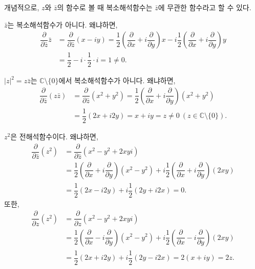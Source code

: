 개념적으로, $z$와 $\bar z$의 함수로 볼 때
복소해석함수는  $\bar z$에 무관한 함수라고 할 수 있다.

\begin{saltexample}{}{} \label{example-2-14}
$\bar z$는 복소해석함수가 아니다. 왜냐하면,
\begin{align*}
\dfrac{\partial}{\partial \bar z}\bar z 
&= \dfrac{\partial}{\partial \bar z} (x-iy)
= \dfrac 12 \left( \dfrac\partial {\partial x} + i \dfrac\partial {\partial y} \right) x
- i \dfrac 12 \left( \dfrac\partial {\partial x} + i \dfrac\partial {\partial y} \right) y \\
&= \dfrac 12 - i\cdot \dfrac12 \cdot i = 1 \ne 0.
\end{align*}
\end{saltexample}

\begin{saltexample}{}{} \label{example-2-15}
$|z|^2 = z\bar z$는 $\mathbb C\setminus \{0\}$에서 복소해석함수가 아니다. 왜냐하면,
\begin{align*}
\dfrac{\partial}{\partial \bar z}(z \bar z)
&= \dfrac{\partial}{\partial \bar z} (x^2+y^2)
= \dfrac12 \left( \dfrac\partial {\partial x} + i \dfrac\partial {\partial y} \right) (x^2+y^2) \\
&= \dfrac 12 (2x+i2y) = x+iy = z \ne 0 \ (z\in\mathbb C\setminus \{0\}).
\end{align*}
\end{saltexample}


\begin{saltexample}{}{} \label{example-2-16}
$z^2$은 전해석함수이다. 왜냐하면,
\begin{align*}
\dfrac{\partial}{\partial \bar z}(z^2)
&= \dfrac{\partial}{\partial \bar z} (x^2-y^2 + 2xyi) \\
&= \dfrac12 \left( \dfrac\partial {\partial x} + i \dfrac\partial {\partial y} \right) (x^2-y^2) 
+ i \dfrac12 \left( \dfrac\partial {\partial x} + i \dfrac\partial {\partial y} \right) (2xy)  \\
&= \dfrac 12 (2x-i2y) + i\dfrac12(2y+i2x) = 0.
\end{align*}
또한,
\begin{align*}
\dfrac{\partial}{\partial z}(z^2)
&= \dfrac{\partial}{\partial z} (x^2-y^2 + 2xyi) \\
&= \dfrac12 \left( \dfrac\partial {\partial x} - i \dfrac\partial {\partial y} \right) (x^2-y^2) 
+ i \dfrac12 \left( \dfrac\partial {\partial x} - i \dfrac\partial {\partial y} \right) (2xy)  \\
&= \dfrac 12 (2x+i2y) + i\dfrac12(2y-i2x) = 2(x+iy)=2z.
\end{align*}
\end{saltexample}

